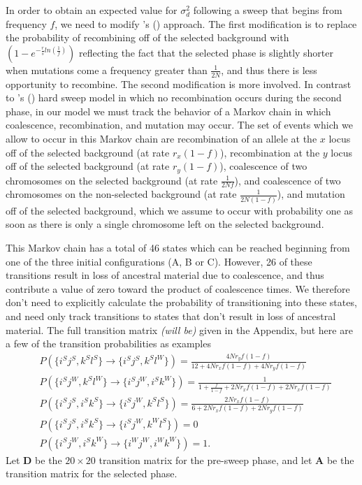 \documentclass[a4paper,10pt]{article}
\newcommand{\jb}[1]{{\it\color{blue} (#1)} }
\def\citeapos#1{\citeauthor{#1}'s (\citeyear{#1})}
\begin{document}
In order to obtain an expected value for $\sigma_d^2$ following a sweep that begins from frequency $f$, we need to modify \citeapos{McVean:2006ke} approach. The first modification is to replace the probability of recombining off of the selected background with $(1 - e^{-\frac{r}{s}ln(\frac{1}{f})})$ reflecting the fact that the selected phase is slightly shorter when mutations come a frequency greater than $\frac{1}{2N}$, and thus there is less opportunity to recombine. The second modification is more involved. In contrast to \citeapos{McVean:2006ke} hard sweep model in which no recombination occurs during the second phase, in our model we must track the behavior of a Markov chain in which coalescence, recombination, and mutation may occur. The set of events which we allow to occur in this Markov chain are recombination of an allele at the $x$ locus off of the selected background (at rate $r_x\left(1-f\right)$), recombination at the $y$ locus off of the selected background (at rate $r_y\left(1-f\right)$), coalescence of two chromosomes on the selected background (at rate $\frac{1}{2Nf}$), and coalescence of two chromosomes on the non-selected background (at rate $\frac{1}{2N\left(1-f\right)}$), and mutation off of the selected background, which we assume to occur with probability one as soon as there is only a single chromosome left on the selected background.

This Markov chain has a total of 46 states which can be reached beginning from one of the three initial configurations (A, B or C). However, 26 of these transitions result in loss of ancestral material due to coalescence, and thus contribute a value of zero toward the product of coalescence times. We therefore don't need to explicitly calculate the probability of transitioning into these states, and need only track transitions to states that don't result in loss of ancestral material. The full transition matrix \jb{will be} given in the Appendix, but here are a few of the transition probabilities as examples
\begin{align}
	&P\left(\{i^Sj^S,k^Sl^S\} \rightarrow \{i^Sj^S,k^Sl^W\}\right) = \frac{4Nr_y f\left(1-f\right)}{12 + 4Nr_x f\left(1-f\right) + 4Nr_y f\left(1-f\right)} \\
	&P\left(\{i^Sj^W,k^Sl^W\} \rightarrow \{i^Sj^W,i^Sk^W\}\right) = \frac{1}{1 + \frac{f}{1-f} + 2Nr_x f\left(1-f\right) + 2Nr_x f\left(1-f\right)} \\
	&P\left(\{i^Sj^S,i^Sk^S\} \rightarrow \{i^Sj^W,k^Sl^S\}\right) = \frac{2Nr_x f\left(1-f\right)}{6 + 2Nr_x f\left(1-f\right) + 2Nr_y f\left(1-f\right)} \\
	&P\left(\{i^Sj^S,i^Sk^S\} \rightarrow \{i^Sj^W,k^Wl^S\}\right) = 0 \\
	&P\left(\{i^Sj^W,i^Sk^W\} \rightarrow \{i^Wj^W,i^Wk^W\}\right) = 1.
\end{align}
Let $\mathbf{D}$ be the $20\times 20$ transition matrix for the pre-sweep phase, and let $\mathbf{A}$ be the transition matrix for the selected phase. 
\end{document}
